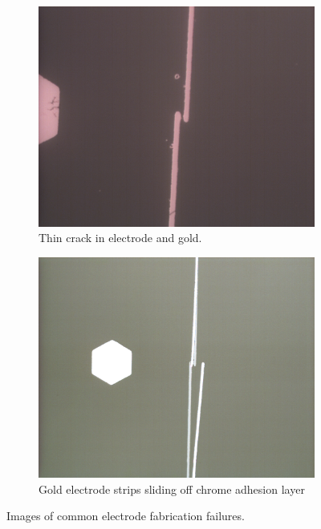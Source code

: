 \begin{figure}[h]
\begin{subfigure}[t]{0.45\textwidth}
    \end{subfigure}
    \\
    \vspace{0.1 in}
    \begin{subfigure}[t]{0.45\textwidth}
        \centering
        \includegraphics[width=\textwidth]{images/electrodeFailureThinBreak.png}
        \caption{Thin crack in electrode and gold.}
    \end{subfigure}
    \hfill
    \begin{subfigure}[t]{0.45\textwidth}
        \centering
        \includegraphics[width=\textwidth]{images/electrodeFailureSlide.png}
        \caption{Gold electrode strips sliding off chrome adhesion layer}
    \end{subfigure}
    \caption{Images of common electrode fabrication failures.}
    \label{fig:failed_elecftrodes_micro}
\end{figure}

